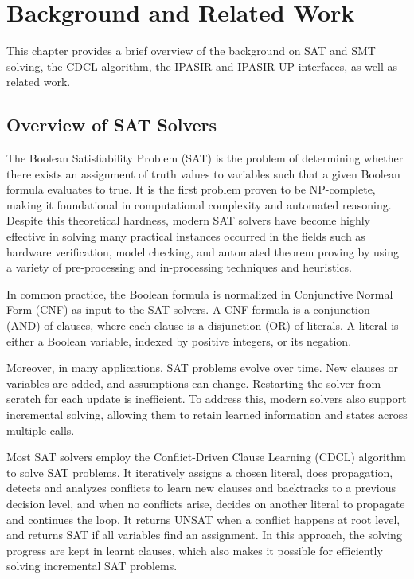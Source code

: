 \chapter{Background and Related Work}

This chapter provides a brief overview of the background on SAT and SMT solving, the CDCL algorithm, the IPASIR and IPASIR-UP interfaces, as well as related work.

\section{Overview of SAT Solvers}

The Boolean Satisfiability Problem (SAT) is the problem of determining whether there exists an assignment of truth values to variables such that a given Boolean formula evaluates to true. It is the first problem proven to be NP-complete, making it foundational in computational complexity and automated reasoning. Despite this theoretical hardness, modern SAT solvers have become highly effective in solving many practical instances occurred in the fields such as hardware verification, model checking, and automated theorem proving by using a variety of pre-processing and in-processing techniques and heuristics.

In common practice, the Boolean formula is normalized in Conjunctive Normal Form (CNF) as input to the SAT solvers. A CNF formula is a conjunction (AND) of clauses, where each clause is a disjunction (OR) of literals. A literal is either a Boolean variable, indexed by positive integers, or its negation.

Moreover, in many applications, SAT problems evolve over time. New clauses or variables are added, and assumptions can change. Restarting the solver from scratch for each update is inefficient. To address this, modern solvers also support incremental solving, allowing them to retain learned information and states across multiple calls.

Most SAT solvers employ the Conflict-Driven Clause Learning (CDCL) algorithm to solve SAT problems. It iteratively assigns a chosen literal, does propagation, detects and analyzes conflicts to learn new clauses and backtracks to a previous decision level, and when no conflicts arise, decides on another literal to propagate and continues the loop. It returns UNSAT when a conflict happens at root level, and returns SAT if all variables find an assignment. In this approach, the solving progress are kept in learnt clauses, which also makes it possible for efficiently solving incremental SAT problems.


